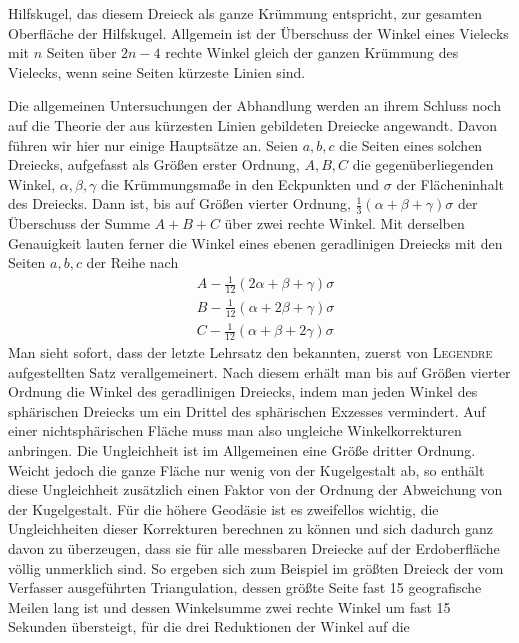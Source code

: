 %
Hilfskugel, das diesem Dreieck als ganze Krümmung entspricht, zur gesamten Oberfläche der Hilfskugel. Allgemein ist der Überschuss der Winkel eines Vielecks mit \(n\) Seiten über \(2n-4\) rechte Winkel gleich der ganzen Krümmung des Vielecks, wenn seine Seiten kürzeste Linien sind.

Die allgemeinen Untersuchungen der Abhandlung werden an ihrem Schluss noch auf die Theorie der aus kürzesten Linien gebildeten Dreiecke angewandt. Davon führen wir hier nur einige Hauptsätze an. Seien \(a,b,c\) die Seiten eines solchen Dreiecks, aufgefasst als Größen erster Ordnung, \(A,B,C\) die gegenüberliegenden Winkel, \(\alpha,\beta,\gamma\) die Krümmungsmaße in den Eckpunkten und \(\sigma\) der Flächeninhalt des Dreiecks. Dann ist, bis auf Größen vierter Ordnung, \(\tfrac13(\alpha+\beta+\gamma)\sigma\) der Überschuss der Summe \(A+B+C\) über zwei rechte Winkel. Mit derselben Genauigkeit lauten ferner die Winkel eines ebenen geradlinigen Dreiecks mit den Seiten \(a,b,c\) der Reihe nach
\[
\begin{aligned}
&A-\tfrac1{12}(2\alpha+\beta+\gamma)\sigma\\
&B-\tfrac1{12}(\alpha+2\beta+\gamma)\sigma\\
&C-\tfrac1{12}(\alpha+\beta+2\gamma)\sigma
\end{aligned}
\]
Man sieht sofort, dass der letzte Lehrsatz den bekannten, zuerst von \textsc{Legendre} aufgestellten Satz verallgemeinert. Nach diesem erhält man bis auf Größen vierter Ordnung die Winkel des geradlinigen Dreiecks, indem man jeden Winkel des sphärischen Dreiecks um ein Drittel des sphärischen Exzesses vermindert. Auf einer nichtsphärischen Fläche muss man also ungleiche Winkelkorrekturen anbringen. Die Ungleichheit ist im Allgemeinen eine Größe dritter Ordnung. Weicht jedoch die ganze Fläche nur wenig von der Kugelgestalt ab, so enthält diese Ungleichheit zusätzlich einen Faktor von der Ordnung der Abweichung von der Kugelgestalt. Für die höhere Geodäsie ist es zweifellos wichtig, die Ungleichheiten dieser Korrekturen berechnen zu können und sich dadurch ganz davon zu überzeugen, dass sie für alle messbaren Dreiecke auf der Erdoberfläche völlig unmerklich sind. So ergeben sich zum Beispiel im größten Dreieck der vom Verfasser ausgeführten Triangulation, dessen größte Seite fast 15 geografische Meilen lang ist und dessen Winkelsumme zwei rechte Winkel um fast 15 Sekunden übersteigt, für die drei Reduktionen der Winkel auf die %
